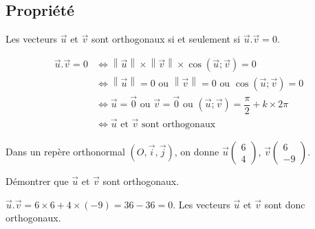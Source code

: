 \documentclass[french]{book}
\newcommand{\vect}[1]{\overrightarrow{#1}}
\newcommand{\oij}{(\textit{O},{\overrightarrow{i}},{\overrightarrow{j}})}
\newcommand{\cp}[2]{%
        \begin{pmatrix}
        #1\\
        #2
        \end{pmatrix}%
        }
\begin{document}
\subsection{Propri\'et\'e}
\begin{prop}
Les vecteurs $\vect{u}$ et $\vect{v}$ sont orthogonaux si et seulement si $\vect{u}.\vect{v}=0$.
\end{prop}

\begin{demo}
\vspace{-1em}
\begin{align*}
 \vect{u}.\vect{v}=0 & \Leftrightarrow \left\|\vect{u}\right\| \times \left\|\vect{v}\right\| \times \cos(\vect{u};\vect{v})=0\\
 & \Leftrightarrow \left\|\vect{u}\right\|=0 \text{ ou } \left\|\vect{v}\right\|=0 \text{ ou } \cos(\vect{u};\vect{v})=0\\
 & \Leftrightarrow \vect{u}=\vect{0} \text{ ou } \vect{v}=\vect{0} \text{ ou } (\vect{u};\vect{v})=\dfrac{\pi}{2}+k\times 2\pi\\
 & \Leftrightarrow \vect{u}\text{ et } \vect{v} \text{ sont orthogonaux}
\end{align*}

\end{demo}

\begin{exemple}
Dans un rep\`ere orthonormal $\oij$, on donne $\vect{u}\cp{6}{4}$, $\vect{v}\cp{6}{-9}$.

D\'emontrer que $\vect{u}$ et $\vect{v}$ sont orthogonaux.
\end{exemple}


$\vect{u}.\vect{v}= 6\times6  + 4\times(-9)  = 36 - 36 =  0$.
Les vecteurs $\vect{u}$ et $\vect{v}$ sont donc orthogonaux.





\end{document}
